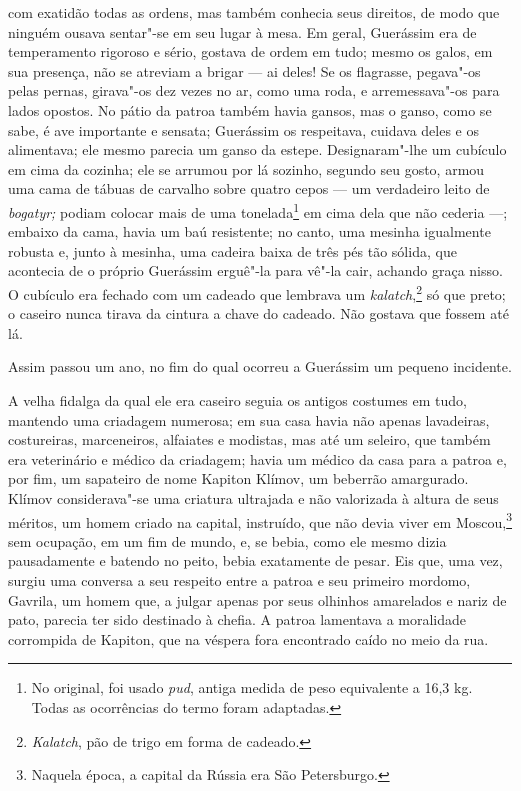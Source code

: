 com exatidão todas as ordens, mas também conhecia seus direitos, de modo
que ninguém ousava sentar"-se em seu lugar à mesa. Em geral, Guerássim
era de temperamento rigoroso e sério, gostava de ordem em tudo; mesmo os
galos, em sua presença, não se atreviam a brigar --- ai deles! Se os
flagrasse, pegava"-os pelas pernas, girava"-os dez vezes no ar, como uma
roda, e arremessava"-os para lados opostos. No pátio da patroa também
havia gansos, mas o ganso, como se sabe, é ave importante e sensata;
Guerássim os respeitava, cuidava deles e os alimentava; ele mesmo
parecia um ganso da estepe. Designaram"-lhe um cubículo em cima da
cozinha; ele se arrumou por lá sozinho, segundo seu gosto, armou uma
cama de tábuas de carvalho sobre quatro cepos --- um verdadeiro leito de
\emph{bogatyr;} podiam colocar mais de uma tonelada\footnote{No
  original, foi usado \emph{pud}, antiga medida de peso equivalente a
  16,3 kg. Todas as ocorrências do termo foram adaptadas.} em cima dela
que não cederia ---; embaixo da cama, havia um baú resistente; no canto,
uma mesinha igualmente robusta e, junto à mesinha, uma cadeira baixa de
três pés tão sólida, que acontecia de o próprio Guerássim erguê"-la para
vê"-la cair, achando graça nisso. O cubículo era fechado com um cadeado
que lembrava um \emph{kalatch},\footnote{\emph{Kalatch}, pão de trigo
  em forma de cadeado.} só que preto; o caseiro nunca tirava da
cintura a chave do cadeado. Não gostava que fossem até lá.

Assim passou um ano, no fim do qual ocorreu a Guerássim um pequeno
incidente.

A velha fidalga da qual ele era caseiro seguia os antigos costumes em
tudo, mantendo uma criadagem numerosa; em sua casa havia não apenas
lavadeiras, costureiras, marceneiros, alfaiates e modistas, mas até um
seleiro, que também era veterinário e médico da criadagem; havia um
médico da casa para a patroa e, por fim, um sapateiro de nome Kapiton
Klímov, um beberrão amargurado. Klímov considerava"-se uma criatura
ultrajada e não valorizada à altura de seus méritos, um homem criado na
capital, instruído, que não devia viver em Moscou,\footnote{Naquela
  época, a capital da Rússia era São Petersburgo.} sem ocupação, em um
fim de mundo, e, se bebia, como ele mesmo dizia pausadamente e batendo
no peito, bebia exatamente de pesar. Eis que, uma vez, surgiu uma
conversa a seu respeito entre a patroa e seu primeiro mordomo, Gavrila,
um homem que, a julgar apenas por seus olhinhos amarelados e nariz de
pato, parecia ter sido destinado à chefia. A patroa lamentava a
moralidade corrompida de Kapiton, que na véspera fora encontrado caído
no meio da rua.

